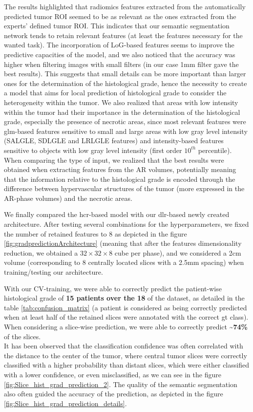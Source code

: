 \documentclass[]{article}
\begin{document}
The results highlighted that radiomics features extracted from the automatically predicted tumor ROI seemed to be as relevant as the ones extracted from the experts' defined tumor ROI. This indicates that our semantic segmentation network tends to retain relevant features (at least the features necessary for the wanted task).
The incorporation of LoG-based features seems to improve the predictive capacities of the model, and we also noticed that the accuracy was higher when filtering images with small filters (in our case 1mm filter gave the best results). This suggests that small details can be more important than larger ones for the determination of the histological grade, hence the necessity to create a model that aims for local prediction of histological grade to consider the heterogeneity within the tumor. We also realized that areas with low intensity within the tumor had their importance in the determination of the histological grade, especially the presence of necrotic areas, since most relevant features were glm-based features sensitive to small and large areas with low gray level intensity (SALGLE, SDLGLE and LRLGLE features) and intensity-based features sensitive to objects with low gray level intensity (first order $10^{th}$ percentile). 
When comparing the type of input, we realized that the best results were obtained when extracting features from the AR volumes, potentially meaning that the information relative to the histological grade is encoded through the difference between hypervascular structures of the tumor (more expressed in the AR-phase volumes) and the necrotic areas.


We finally compared the \ac{hcr}-based model with our \ac{dlr}-based newly created architecture.
After testing several combinations for the hyperparameters, we
fixed the number of retained features to 8 as depicted in the
figure \ref{fig:gradpredictionArchitecture} (meaning that after the features dimensionality reduction,
we obtained a $ 32\times32\times8 $ cube per phase), and we considered a 2cm volume
(corresponding to 8 centrally located slices with a 2.5mm spacing) when
training/testing our architecture.

With our CV-training, we were able to correctly predict the patient-wise
histological grade of \textbf{15 patients over the 18} of the dataset, as detailed in the table \ref{tab:confusion_matrix} (a patient is considered as being correctly predicted
when at least half of the retained slices were annotated with the
correct \ac{gt} class).
When considering a slice-wise prediction, we were able to correctly
predict \textbf{\textasciitilde{}74\%} of the slices.\\
It has been observed that the classification confidence was often correlated with the distance to the center of the tumor, where central tumor slices were correctly classified with a higher probability than distant slices, which were either classified with a lower confidence, or even misclassified, as we can see in the figure \ref{fig:Slice_hist_grad_prediction_2}. The quality of the semantic segmentation also often guided the accuracy of the prediction, as depicted in the figure \ref{fig:Slice_hist_grad_prediction_details}.
\end{document}
